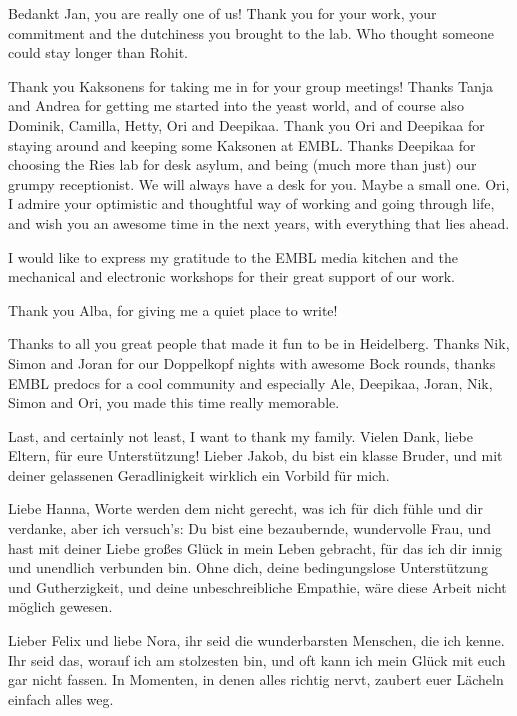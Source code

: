 \documentclass[
12pt, %
ngerman,
english, %
onehalfspacing,
hidelinks,
toctotoc, %
headsepline, %
]{MastersDoctoralThesis} %
\begin{document}
\begin{acknowledgements}
Bedankt Jan, you are really one of us! Thank you for your work, your commitment and the dutchiness you brought to the lab. Who thought someone could stay longer than Rohit. 

Thank you Kaksonens for taking me in for your group meetings! Thanks Tanja and Andrea for getting me started into the yeast world, and of course also Dominik, Camilla, Hetty, Ori and Deepikaa. Thank you Ori and Deepikaa for staying around and keeping some Kaksonen at EMBL. Thanks Deepikaa for choosing the Ries lab for desk asylum, and being (much more than just) our grumpy receptionist. We will always have a desk for you. Maybe a small one. Ori, I admire your optimistic and thoughtful way of working and going through life, and wish you an awesome time in the next years, with everything that lies ahead.

I would like to express my gratitude to the EMBL media kitchen and the mechanical and electronic workshops for their great support of our work.

Thank you Alba, for giving me a quiet place to write!

Thanks to all you great people that made it fun to be in Heidelberg. Thanks Nik, Simon and Joran for our Doppelkopf nights with awesome Bock rounds, thanks EMBL predocs for a cool community and especially Ale, Deepikaa, Joran, Nik, Simon and Ori, you made this time really memorable.

\vspace{\baselineskip}

Last, and certainly not least, I want to thank my family. Vielen Dank, liebe Eltern, für eure Unterstützung! Lieber Jakob, du bist ein klasse Bruder, und mit deiner gelassenen Geradlinigkeit wirklich ein Vorbild für mich.

\vspace{\baselineskip}

Liebe Hanna, Worte werden dem nicht gerecht, was ich für dich fühle und dir verdanke, aber ich versuch's: Du bist eine bezaubernde, wundervolle Frau, und hast mit deiner Liebe großes Glück in mein Leben gebracht, für das ich dir innig und unendlich verbunden bin. Ohne dich, deine bedingungslose Unterstützung und Gutherzigkeit, und deine unbeschreibliche Empathie, wäre diese Arbeit nicht möglich gewesen.

\vspace{\baselineskip}

Lieber Felix und liebe Nora, ihr seid die wunderbarsten Menschen, die ich kenne. Ihr seid das, worauf ich am stolzesten bin, und oft kann ich mein Glück mit euch gar nicht fassen. In Momenten, in denen alles richtig nervt, zaubert euer Lächeln einfach alles weg.



\end{acknowledgements}
\end{document}
